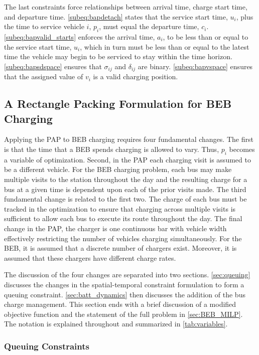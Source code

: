 \documentclass[11pt,a4paper,final]{article}
\begin{document}
The last constraints force relationships between arrival time, charge start time, and departure time.
\autoref{subeq:bapdetach} states that the service start time, \(u_i\), plus the time to service vehicle \(i\), \(p_i\), must
equal the departure time, \(c_i\). \autoref{subeq:bapvalid_starts} enforces the arrival time, \(a_i\), to be less than or
equal to the service start time, \(u_i\), which in turn must be less than or equal to the latest time the vehicle may
begin to be serviced to stay within the time horizon. \autoref{subeq:bapsdspace} ensures that \(\sigma_{ij}\) and
\(\delta_{ij}\) are binary. \autoref{subeq:bapvspace} ensures that the assigned value of \(v_i\) is a valid charging position.
\subsection{A Rectangle Packing Formulation for BEB Charging}  \label{sec:problemformulation}

Applying the PAP to BEB charging requires four fundamental changes. The first is that the time that a BEB spends
charging is allowed to vary. Thus, \(p_i\) becomes a variable of optimization. Second, in the PAP each charging visit is
assumed to be a different vehicle. For the BEB charging problem, each bus may make multiple visits to the station
throughout the day and the resulting charge for a bus at a given time is dependent upon each of the prior visits made.
The third fundamental change is related to the first two. The charge of each bus must be tracked in
the optimization to ensure that charging across multiple visits is sufficient to allow each bus to execute its route throughout the day.
The final change in the PAP, the charger is one continuous bar with vehicle width effectively restricting the number of vehicles
charging simultaneously. For the BEB, it is assumed that a discrete number of chargers exist. Moreover, it is assumed
that these chargers have different charge rates.

The discussion of the four changes are separated into two sections. \autoref{sec:queuing} discusses the changes in the
spatial-temporal constraint formulation to form a queuing constraint. \autoref{sec:batt_dynamics} then discusses the
addition of the bus charge management. This section ends with a brief discussion of a modified objective function and
the statement of the full problem in \autoref{sec:BEB_MILP}. The notation is explained throughout and summarized in
\autoref{tab:variables}.

\subsubsection{Queuing Constraints} \label{sec:queuing}
\end{document}
